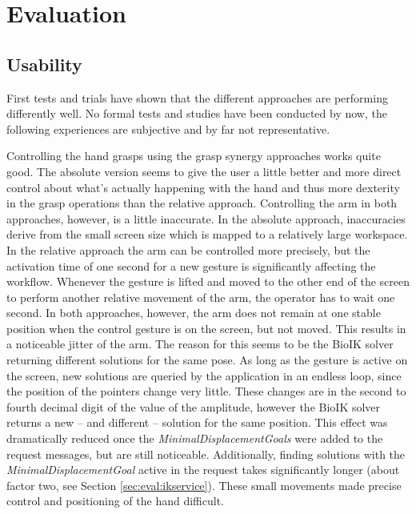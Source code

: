 \chapter{Evaluation}
\label{chap:eval}

\section{Usability}

First tests and trials have shown that the different approaches are performing differently well. No formal tests and studies have been conducted by now, the following experiences are subjective and by far not representative.

Controlling the hand grasps using the grasp synergy approaches works quite good. The absolute version seems to give the user a little better and more direct control about what's actually happening with the hand and thus more dexterity in the grasp operations than the relative approach. Controlling the arm in both approaches, however, is a little inaccurate. 
In the absolute approach, inaccuracies derive from the small screen size which is mapped to a relatively large workspace. In the relative approach the arm can be controlled more precisely, but the activation time of one second for a new gesture is significantly affecting the workflow. Whenever the gesture is lifted and moved to the other end of the screen to perform another relative movement of the arm, the operator has to wait one second.
In both approaches, however, the arm does not remain at one stable position when the control gesture is on the screen, but not moved. This results in a noticeable jitter of the arm. The reason for this seems to be the BioIK solver returning different solutions for the same pose. As long as the gesture is active on the screen, new solutions are queried by the application in an endless loop, since the position of the pointers change very little. These changes are in the second to fourth decimal digit of the value of the amplitude, however the BioIK solver returns a new -- and different -- solution for the same position. This effect was dramatically reduced once the \textit{MinimalDisplacementGoals} were added to the request messages, but are still noticeable. Additionally, finding solutions with the \textit{MinimalDisplacementGoal} active in the request takes significantly longer (about factor two, see Section \ref{sec:eval:ikservice}).  These small movements made precise control and positioning of the hand difficult. 

